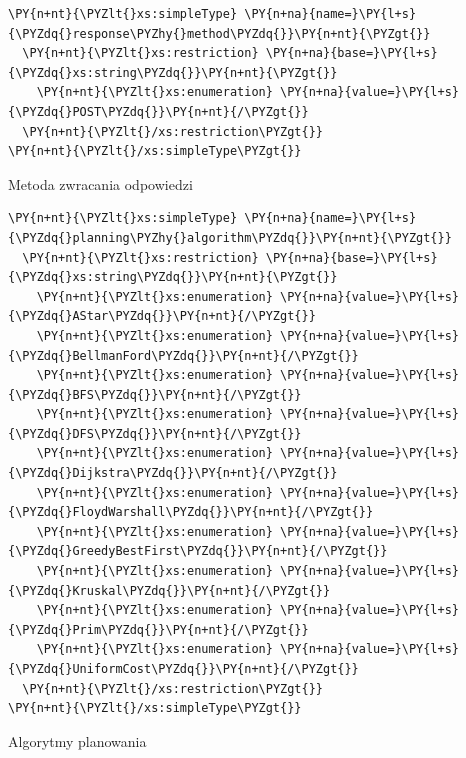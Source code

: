 \begin{program}
\begin{code}
\begin{Verbatim}[commandchars=\\\{\}]
\PY{n+nt}{\PYZlt{}xs:simpleType} \PY{n+na}{name=}\PY{l+s}{\PYZdq{}response\PYZhy{}method\PYZdq{}}\PY{n+nt}{\PYZgt{}}
  \PY{n+nt}{\PYZlt{}xs:restriction} \PY{n+na}{base=}\PY{l+s}{\PYZdq{}xs:string\PYZdq{}}\PY{n+nt}{\PYZgt{}}
    \PY{n+nt}{\PYZlt{}xs:enumeration} \PY{n+na}{value=}\PY{l+s}{\PYZdq{}POST\PYZdq{}}\PY{n+nt}{/\PYZgt{}}
  \PY{n+nt}{\PYZlt{}/xs:restriction\PYZgt{}}
\PY{n+nt}{\PYZlt{}/xs:simpleType\PYZgt{}}
\end{Verbatim}
\end{code}
\caption{Metoda zwracania odpowiedzi}
\end{program}

\begin{program}
\begin{code}
\begin{Verbatim}[commandchars=\\\{\}]
\PY{n+nt}{\PYZlt{}xs:simpleType} \PY{n+na}{name=}\PY{l+s}{\PYZdq{}planning\PYZhy{}algorithm\PYZdq{}}\PY{n+nt}{\PYZgt{}}
  \PY{n+nt}{\PYZlt{}xs:restriction} \PY{n+na}{base=}\PY{l+s}{\PYZdq{}xs:string\PYZdq{}}\PY{n+nt}{\PYZgt{}}
    \PY{n+nt}{\PYZlt{}xs:enumeration} \PY{n+na}{value=}\PY{l+s}{\PYZdq{}AStar\PYZdq{}}\PY{n+nt}{/\PYZgt{}}
    \PY{n+nt}{\PYZlt{}xs:enumeration} \PY{n+na}{value=}\PY{l+s}{\PYZdq{}BellmanFord\PYZdq{}}\PY{n+nt}{/\PYZgt{}}
    \PY{n+nt}{\PYZlt{}xs:enumeration} \PY{n+na}{value=}\PY{l+s}{\PYZdq{}BFS\PYZdq{}}\PY{n+nt}{/\PYZgt{}}
    \PY{n+nt}{\PYZlt{}xs:enumeration} \PY{n+na}{value=}\PY{l+s}{\PYZdq{}DFS\PYZdq{}}\PY{n+nt}{/\PYZgt{}}
    \PY{n+nt}{\PYZlt{}xs:enumeration} \PY{n+na}{value=}\PY{l+s}{\PYZdq{}Dijkstra\PYZdq{}}\PY{n+nt}{/\PYZgt{}}
    \PY{n+nt}{\PYZlt{}xs:enumeration} \PY{n+na}{value=}\PY{l+s}{\PYZdq{}FloydWarshall\PYZdq{}}\PY{n+nt}{/\PYZgt{}}
    \PY{n+nt}{\PYZlt{}xs:enumeration} \PY{n+na}{value=}\PY{l+s}{\PYZdq{}GreedyBestFirst\PYZdq{}}\PY{n+nt}{/\PYZgt{}}
    \PY{n+nt}{\PYZlt{}xs:enumeration} \PY{n+na}{value=}\PY{l+s}{\PYZdq{}Kruskal\PYZdq{}}\PY{n+nt}{/\PYZgt{}}
    \PY{n+nt}{\PYZlt{}xs:enumeration} \PY{n+na}{value=}\PY{l+s}{\PYZdq{}Prim\PYZdq{}}\PY{n+nt}{/\PYZgt{}}
    \PY{n+nt}{\PYZlt{}xs:enumeration} \PY{n+na}{value=}\PY{l+s}{\PYZdq{}UniformCost\PYZdq{}}\PY{n+nt}{/\PYZgt{}}
  \PY{n+nt}{\PYZlt{}/xs:restriction\PYZgt{}}
\PY{n+nt}{\PYZlt{}/xs:simpleType\PYZgt{}}
\end{Verbatim}
\end{code}
\caption{Algorytmy planowania}
\end{program}


